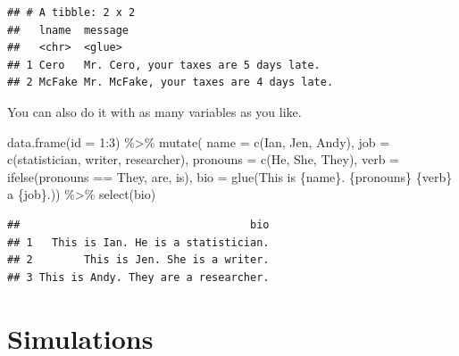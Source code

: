 \documentclass[
]{book}
\newenvironment{Shaded}{\begin{snugshade}}{\end{snugshade}}
\newcommand{\AttributeTok}[1]{\textcolor[rgb]{0.77,0.63,0.00}{#1}}
\newcommand{\DecValTok}[1]{\textcolor[rgb]{0.00,0.00,0.81}{#1}}
\newcommand{\FunctionTok}[1]{\textcolor[rgb]{0.00,0.00,0.00}{#1}}
\newcommand{\NormalTok}[1]{#1}
\newcommand{\SpecialCharTok}[1]{\textcolor[rgb]{0.00,0.00,0.00}{#1}}
\newcommand{\StringTok}[1]{\textcolor[rgb]{0.31,0.60,0.02}{#1}}
\begin{document}
\begin{verbatim}
## # A tibble: 2 x 2
##   lname  message                                
##   <chr>  <glue>                                 
## 1 Cero   Mr. Cero, your taxes are 5 days late.  
## 2 McFake Mr. McFake, your taxes are 4 days late.
\end{verbatim}

You can also do it with as many variables as you like.

\begin{Shaded}
\begin{Highlighting}[]
\FunctionTok{data.frame}\NormalTok{(}\AttributeTok{id =} \DecValTok{1}\SpecialCharTok{:}\DecValTok{3}\NormalTok{) }\SpecialCharTok{\%\textgreater{}\%} 
  \FunctionTok{mutate}\NormalTok{(}
    \AttributeTok{name =} \FunctionTok{c}\NormalTok{(}\StringTok{\textquotesingle{}Ian\textquotesingle{}}\NormalTok{, }\StringTok{\textquotesingle{}Jen\textquotesingle{}}\NormalTok{, }\StringTok{\textquotesingle{}Andy\textquotesingle{}}\NormalTok{),}
    \AttributeTok{job =} \FunctionTok{c}\NormalTok{(}\StringTok{\textquotesingle{}statistician\textquotesingle{}}\NormalTok{, }\StringTok{\textquotesingle{}writer\textquotesingle{}}\NormalTok{, }\StringTok{\textquotesingle{}researcher\textquotesingle{}}\NormalTok{),}
    \AttributeTok{pronouns =} \FunctionTok{c}\NormalTok{(}\StringTok{\textquotesingle{}He\textquotesingle{}}\NormalTok{, }\StringTok{\textquotesingle{}She\textquotesingle{}}\NormalTok{, }\StringTok{\textquotesingle{}They\textquotesingle{}}\NormalTok{),}
    \AttributeTok{verb =} \FunctionTok{ifelse}\NormalTok{(pronouns }\SpecialCharTok{==} \StringTok{\textquotesingle{}They\textquotesingle{}}\NormalTok{, }\StringTok{\textquotesingle{}are\textquotesingle{}}\NormalTok{, }\StringTok{\textquotesingle{}is\textquotesingle{}}\NormalTok{),}
    \AttributeTok{bio =} \FunctionTok{glue}\NormalTok{(}\StringTok{\textquotesingle{}This is \{name\}. \{pronouns\} \{verb\} a \{job\}.\textquotesingle{}}\NormalTok{)) }\SpecialCharTok{\%\textgreater{}\%} 
  \FunctionTok{select}\NormalTok{(bio)}
\end{Highlighting}
\end{Shaded}

\begin{verbatim}
##                                    bio
## 1   This is Ian. He is a statistician.
## 2        This is Jen. She is a writer.
## 3 This is Andy. They are a researcher.
\end{verbatim}

\hypertarget{simulations}{%
\chapter{Simulations}\label{simulations}}
\end{document}

